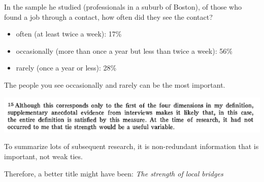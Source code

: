 \documentclass[aspectratio=169]{beamer}
\begin{document}
\begin{frame}

In the sample he studied (professionals in a suburb of Boston), of those who found a job through a contact, how often did they see the contact?
\begin{itemize}
\item often (at least twice a week): 17\%
\item occasionally (more than once a year but less than twice a week): 56\%
\item rarely (once a year or less): 28\%
\end{itemize}

The people you see occasionally and rarely can be the most important.

\end{frame}
\begin{frame}

\includegraphics[width=\textwidth]{figures/granovetter_strength_1973_ft15}

\end{frame}
\begin{frame}

To summarize lots of subsequent research, it is non-redundant information that is important, not weak ties.

\vfill
Therefore, a better title might have been: \emph{The strength of local bridges}

\end{frame}
\end{document}
